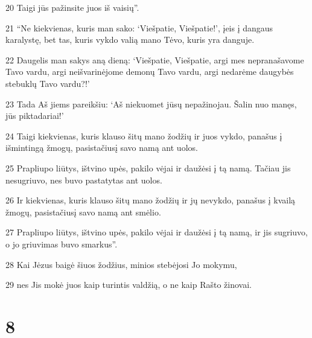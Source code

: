 \par 20 Taigi jūs pažinsite juos iš vaisių”. 
\par 21 “Ne kiekvienas, kuris man sako: ‘Viešpatie, Viešpatie!’, įeis į dangaus karalystę, bet tas, kuris vykdo valią mano Tėvo, kuris yra danguje. 
\par 22 Daugelis man sakys aną dieną: ‘Viešpatie, Viešpatie, argi mes nepranašavome Tavo vardu, argi neišvarinėjome demonų Tavo vardu, argi nedarėme daugybės stebuklų Tavo vardu?!’ 
\par 23 Tada Aš jiems pareikšiu: ‘Aš niekuomet jūsų nepažinojau. Šalin nuo manęs, jūs piktadariai!’ 
\par 24 Taigi kiekvienas, kuris klauso šitų mano žodžių ir juos vykdo, panašus į išmintingą žmogų, pasistačiusį savo namą ant uolos. 
\par 25 Prapliupo liūtys, ištvino upės, pakilo vėjai ir daužėsi į tą namą. Tačiau jis nesugriuvo, nes buvo pastatytas ant uolos. 
\par 26 Ir kiekvienas, kuris klauso šitų mano žodžių ir jų nevykdo, panašus į kvailą žmogų, pasistačiusį savo namą ant smėlio. 
\par 27 Prapliupo liūtys, ištvino upės, pakilo vėjai ir daužėsi į tą namą, ir jis sugriuvo, o jo griuvimas buvo smarkus”. 
\par 28 Kai Jėzus baigė šiuos žodžius, minios stebėjosi Jo mokymu, 
\par 29 nes Jis mokė juos kaip turintis valdžią, o ne kaip Rašto žinovai.



\chapter{8}


